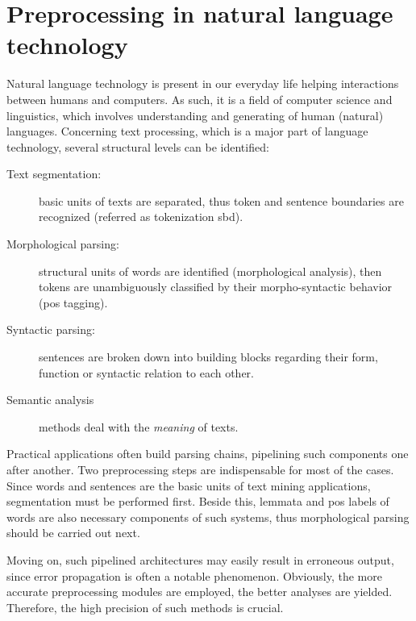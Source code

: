 \section{Preprocessing in natural language technology}



Natural language technology is present in our everyday life helping interactions between humans and computers.
As such, it is a field of computer science and linguistics, which involves understanding and generating of human (natural) languages.
Concerning text processing, which is a major part of language technology, several structural levels can be identified:
\begin{description}
\item[Text segmentation:] basic units of texts are separated, thus token  and sentence boundaries are recognized (referred as tokenization \gls{sbd}).
\item[Morphological parsing:] structural units of words are identified (morphological analysis), then tokens are unambiguously classified by their morpho-syntactic behavior (\acrlong{pos} tagging).
\item[Syntactic parsing:] sentences are broken down into building blocks regarding their form, function or syntactic relation to each other.
\item[Semantic analysis] methods deal with the \emph{meaning} of texts.
\end{description}

Practical applications often build parsing chains, pipelining such components one after another. 
Two preprocessing steps are indispensable for most of the cases.
Since words and sentences are the basic units of text mining applications, segmentation must be performed first.
Beside this, lemmata and \gls{pos} labels of words are also necessary components of such systems, thus morphological parsing should be carried out next.

Moving on, such pipelined architectures may easily result in erroneous output, since error propagation is often a notable phenomenon. 
Obviously, the more accurate preprocessing modules are employed, the better analyses are yielded. Therefore, the high precision of such methods is crucial.

